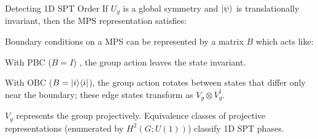 \begin{block}{Detecting 1D SPT Order}
\vskip1cm
If $U_g$ is a global symmetry and $\vert \psi \rangle$ is translationally invariant, then the MPS representation satisfies:

\begin{figure}[h]
    \centering
\end{figure}

Boundary conditions on a MPS can be represented by a matrix $B$ which acts like: 

\begin{figure}[h]
    \centering
\end{figure}

With PBC ($B=I$) , the group action leaves the state invariant. 

With OBC ($B = \vert i \rangle\langle i \vert$), the group action rotates between states that differ only near the boundary; these edge states transform as $V_g \otimes V_g^{\dagger}$. 

$V_g$ represents the group projectively. Equivalence classes of projective representations (enumerated by $H^2(G; U(1))$) classify 1D SPT phases.

\end{block}